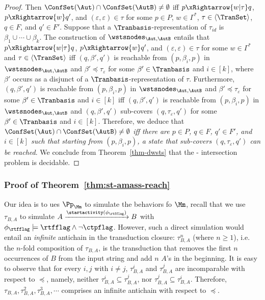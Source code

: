 \begin{proof}
Then $\ConfSet(\Aut) \cap \ConfSet(\AutB) \neq \emptyset$ iff $p \xRightarrow{w | \tau} q$, $p \xRightarrow{w} q'$, and $(\varepsilon, \varepsilon) \in \tau$ for some $p \in P$, $w \in \Gamma^*$, $\tau \in \langle \TranSet \rangle$, $q \in F$, and $q' \in F'$. Suppose that a $\Tranbasis$-representation of $\tau_{id}$ is $\beta_1 \cup \cdots \cup \beta_k$. 
The construction of $\wstsnodes_{\Aut,\AutB}$ entails that $p \xRightarrow{w | \tau} q$, $p \xRightarrow{w} q'$, and $(\varepsilon, \varepsilon) \in \tau$ for some $w \in \Gamma^*$  and $\tau \in \langle \TranSet \rangle$  iff $(q, \beta', q')$ is reachable from $(p, \beta_i, p)$ in $\wstsnodes_{\Aut,\AutB}$ and $\beta' \preceq \tau_\varepsilon$ for some $\beta' \in \Tranbasis$ and $i \in [k]$, where $\beta'$ occurs as a disjunct of a $\Tranbasis$-representation of $\tau$. 
%
Furthermore, $(q, \beta', q')$ is reachable from $(p, \beta_i, p)$ in $\wstsnodes_{\Aut,\AutB}$ and $\beta' \preceq \tau_\varepsilon$ for some $\beta' \in \Tranbasis$ and $i \in [k]$ iff $(q, \beta', q')$ is reachable from $(p, \beta_i, p)$ in $\wstsnodes_{\Aut,\AutB}$ and $(q, \beta', q')$ sub-covers $(q, \tau_\varepsilon, q')$ for some $\beta' \in \Tranbasis$ and $i \in [k]$. Therefore, we deduce that \emph{$\ConfSet(\Aut) \cap \ConfSet(\AutB) \neq \emptyset$ iff there are $p \in P$, $q \in F$, $q' \in F'$, and $i \in [k]$ such that starting from $(p, \beta_i, p)$, a state that sub-covers $(q, \tau_\varepsilon, q')$ can be reached}.
We conclude from Theorem~\ref{thm-dwsts} that the {\WOTrNFA}-{\NFA} intersection problem is decidable.
\end{proof}


\subsubsection{Proof of Theorem~\ref{thm:st-amass-reach}}\label{sec-proof-reach}
Our idea is to ues {\WOTrPDS} $\Pp_{\Mm}$ to simulate the behaviors fo $\Mm$, recall that we use $\tau_{B, A}$ to simulate $A\xrightarrow{\startactivity(\phi_{\rtfflag})}B$ with $\phi_{\rtfflag}\models\rtfflag\wedge\neg\ctpflag$.
However, such a direct simulation would entail an \emph{infinite} antichain in the transduction closure: $\tau^n_{B, A}$  (where $n \ge 1$), i.e. the $n$-fold composition of $\tau_{B,A}$, is the transduction that removes the first $n$ occurrences of $B$ from the input string and add $n$ $A$'s in the beginning. It is easy to observe that for every $i, j$ with $i \neq j$, $\tau^i_{B, A}$ and $\tau^j_{B, A}$ are incomparable with respect to $\preceq$, namely, neither $\tau^i_{B, A} \subseteq \tau^j_{B, A}$, nor $\tau^j_{B, A} \subseteq \tau^i_{B, A}$. Therefore, $\tau_{B, A}, \tau^2_{B, A}, \tau^3_{B, A}, \cdots$ comprises an infinite antichain with respect to $\preceq$. 

